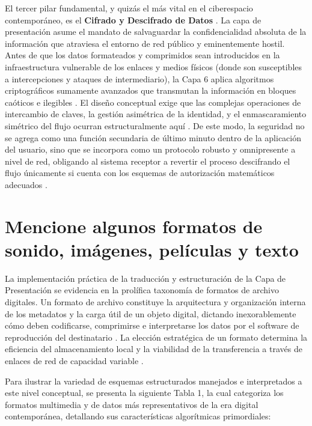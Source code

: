 \documentclass[a4paper,12pt]{article}
\begin{document}
El tercer pilar fundamental, y quizás el más vital en el ciberespacio contemporáneo, es el \textbf{Cifrado y Descifrado de Datos} \cite{ibm_osi_layer6, uazuay_pres}. La capa de presentación asume el mandato de salvaguardar la confidencialidad absoluta de la información que atraviesa el entorno de red público y eminentemente hostil. Antes de que los datos formateados y comprimidos sean introducidos en la infraestructura vulnerable de los enlaces y medios físicos (donde son susceptibles a intercepciones y ataques de intermediario), la Capa 6 aplica algoritmos criptográficos sumamente avanzados que transmutan la información en bloques caóticos e ilegibles \cite{trendmicro_osi, sentinel_enc}. El diseño conceptual exige que las complejas operaciones de intercambio de claves, la gestión asimétrica de la identidad, y el enmascaramiento simétrico del flujo ocurran estructuralmente aquí \cite{avast_tls}. De este modo, la seguridad no se agrega como una función secundaria de último minuto dentro de la aplicación del usuario, sino que se incorpora como un protocolo robusto y omnipresente a nivel de red, obligando al sistema receptor a revertir el proceso descifrando el flujo únicamente si cuenta con los esquemas de autorización matemáticos adecuados \cite{ibm_crypto}.

\section{Mencione algunos formatos de sonido, imágenes, películas y texto}

La implementación práctica de la traducción y estructuración de la Capa de Presentación se evidencia en la prolífica taxonomía de formatos de archivo digitales. Un formato de archivo constituye la arquitectura y organización interna de los metadatos y la carga útil de un objeto digital, dictando inexorablemente cómo deben codificarse, comprimirse e interpretarse los datos por el software de reproducción del destinatario \cite{wix_files, lenovo_formats}. La elección estratégica de un formato determina la eficiencia del almacenamiento local y la viabilidad de la transferencia a través de enlaces de red de capacidad variable \cite{capcut_audio}.

Para ilustrar la variedad de esquemas estructurados manejados e interpretados a este nivel conceptual, se presenta la siguiente Tabla 1, la cual categoriza los formatos multimedia y de datos más representativos de la era digital contemporánea, detallando sus características algorítmicas primordiales:
\end{document}
